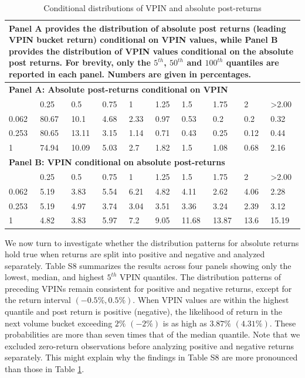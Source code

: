 \begin{table}[H]
\caption{Conditional distributions of VPIN and absolute post-returns}
\label{tab:table_distributions_vpin_absolutereturns}
\renewcommand{\arraystretch}{1.15}
\setlength{\tabcolsep}{3pt}
\setlength{\arrayrulewidth}{1pt}
\small
\begin{tabular}{p{1.2cm}p{1.2cm}p{1.2cm}p{1.2cm}p{1.2cm}p{1.2cm}p{1.2cm}p{1.2cm}p{1.2cm}p{1.2cm}}
\toprule
\multicolumn{10}{p{14cm}}{\footnotesize Panel A provides the distribution of absolute post returns (leading VPIN bucket return) conditional on VPIN values, while Panel B provides the distribution of VPIN values conditional on the absolute post returns. For brevity, only the $5^{th}$, $50^{th}$ and $100^{th}$ quantiles are reported in each panel. Numbers are given in percentages.}\\
\midrule
\multicolumn{10}{p{14cm}}{\textbf{Panel A: Absolute post-returns conditional on VPIN}}\\
\midrule
&  0.25&  0.5&  0.75&  1&  1.25&  1.5&  1.75&  2&  >2.00\\
0.062&80.67&10.1&4.68&2.33&0.97&0.53&0.2&0.2&0.32\\
0.253&80.65&13.11&3.15&1.14&0.71&0.43&0.25&0.12&0.44\\
1&74.94&10.09&5.03&2.7&1.82&1.5&1.08&0.68&2.16\\

\midrule
\multicolumn{10}{p{14cm}}{\textbf{Panel B: VPIN conditional on absolute post-returns}}\\
\midrule
&  0.25&  0.5&  0.75&  1&  1.25&  1.5&  1.75&  2&  >2.00\\
0.062&5.19&3.83&5.54&6.21&4.82&4.11&2.62&4.06&2.28\\
0.253&5.19&4.97&3.74&3.04&3.51&3.36&3.24&2.39&3.12\\
1&4.82&3.83&5.97&7.2&9.05&11.68&13.87&13.6&15.19\\
\bottomrule
\end{tabular}
\end{table}


 We now turn to investigate whether the distribution patterns for absolute returns hold true when returns are split into positive and negative and analyzed separately. Table S8 summarizes the results across four panels showing only the lowest, median, and highest $5^{th}$ VPIN quantiles.  
The distribution patterns of preceding VPINs remain consistent for positive and negative returns, except for the return interval $(-0.5\%,0.5\%)$. When VPIN values are within the highest quantile and post return is positive (negative), the likelihood of return in the next volume bucket exceeding $2\%$ $(-2\%)$ is as high as $3.87\%$ 
$(4.31\%)$. These probabilities are more than seven times that of the median quantile. Note that we excluded zero-return observations before analyzing positive and negative returns separately. This might explain why the findings in Table S8 are  more pronounced than those in Table \ref{tab:table_distributions_vpin_absolutereturns}.

